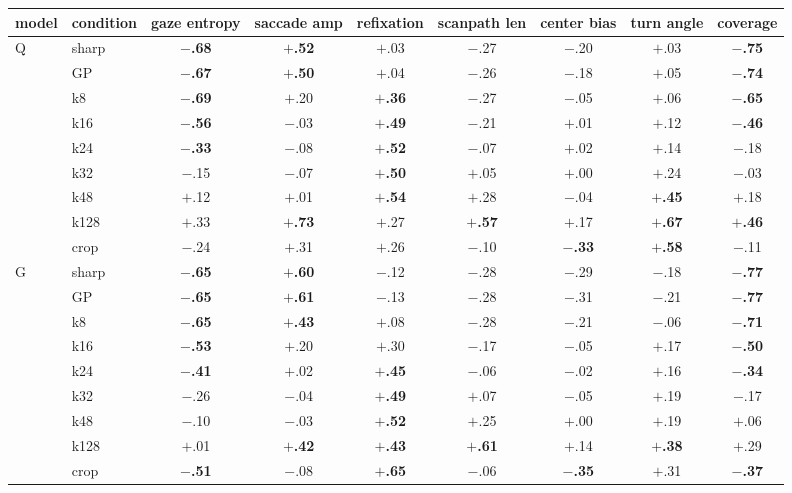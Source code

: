 \begin{tabular}{llccccccc}
\toprule
model & condition & gaze entropy & saccade amp & refixation & scanpath len & center bias & turn angle & coverage \\
\midrule
Q & sharp & \textbf{$-$.68} & \textbf{$+$.52} & $+$.03 & $-$.27 & $-$.20 & $+$.03 & \textbf{$-$.75} \\
 & GP & \textbf{$-$.67} & \textbf{$+$.50} & $+$.04 & $-$.26 & $-$.18 & $+$.05 & \textbf{$-$.74} \\
 & k8 & \textbf{$-$.69} & $+$.20 & \textbf{$+$.36} & $-$.27 & $-$.05 & $+$.06 & \textbf{$-$.65} \\
 & k16 & \textbf{$-$.56} & $-$.03 & \textbf{$+$.49} & $-$.21 & $+$.01 & $+$.12 & \textbf{$-$.46} \\
 & k24 & \textbf{$-$.33} & $-$.08 & \textbf{$+$.52} & $-$.07 & $+$.02 & $+$.14 & $-$.18 \\
 & k32 & $-$.15 & $-$.07 & \textbf{$+$.50} & $+$.05 & $+$.00 & $+$.24 & $-$.03 \\
 & k48 & $+$.12 & $+$.01 & \textbf{$+$.54} & $+$.28 & $-$.04 & \textbf{$+$.45} & $+$.18 \\
 & k128 & $+$.33 & \textbf{$+$.73} & $+$.27 & \textbf{$+$.57} & $+$.17 & \textbf{$+$.67} & \textbf{$+$.46} \\
 & crop & $-$.24 & $+$.31 & $+$.26 & $-$.10 & \textbf{$-$.33} & \textbf{$+$.58} & $-$.11 \\
\midrule
G & sharp & \textbf{$-$.65} & \textbf{$+$.60} & $-$.12 & $-$.28 & $-$.29 & $-$.18 & \textbf{$-$.77} \\
 & GP & \textbf{$-$.65} & \textbf{$+$.61} & $-$.13 & $-$.28 & $-$.31 & $-$.21 & \textbf{$-$.77} \\
 & k8 & \textbf{$-$.65} & \textbf{$+$.43} & $+$.08 & $-$.28 & $-$.21 & $-$.06 & \textbf{$-$.71} \\
 & k16 & \textbf{$-$.53} & $+$.20 & $+$.30 & $-$.17 & $-$.05 & $+$.17 & \textbf{$-$.50} \\
 & k24 & \textbf{$-$.41} & $+$.02 & \textbf{$+$.45} & $-$.06 & $-$.02 & $+$.16 & \textbf{$-$.34} \\
 & k32 & $-$.26 & $-$.04 & \textbf{$+$.49} & $+$.07 & $-$.05 & $+$.19 & $-$.17 \\
 & k48 & $-$.10 & $-$.03 & \textbf{$+$.52} & $+$.25 & $+$.00 & $+$.19 & $+$.06 \\
 & k128 & $+$.01 & \textbf{$+$.42} & \textbf{$+$.43} & \textbf{$+$.61} & $+$.14 & \textbf{$+$.38} & $+$.29 \\
 & crop & \textbf{$-$.51} & $-$.08 & \textbf{$+$.65} & $-$.06 & \textbf{$-$.35} & $+$.31 & \textbf{$-$.37} \\

\end{tabular}
